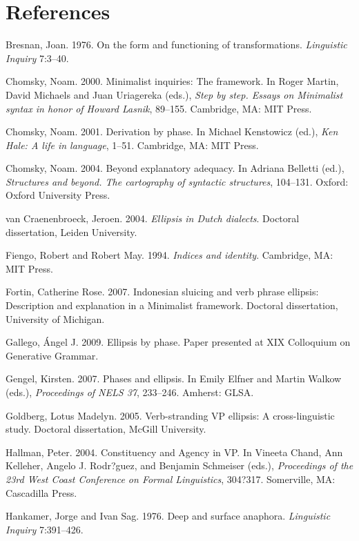 \documentclass[output=paper]{LSP/langsci}
\begin{document}
\section*{References}
 \printbibliography[heading=subbibliography,notkeyword=this]

\begin{reflist}

Bresnan, Joan. 1976. On the form and functioning of transformations. \emph{Linguistic Inquiry} 7:3--40.

Chomsky, Noam. 2000. Minimalist inquiries: The framework. In Roger Martin, David Michaels and Juan Uriagereka (eds.), \emph{Step by step. Essays on Minimalist syntax in honor of Howard Lasnik}, 89--155. Cambridge, MA: MIT Press.

Chomsky, Noam. 2001. Derivation by phase. In Michael Kenstowicz (ed.), \emph{Ken Hale: A life in language}, 1--51. Cambridge, MA: MIT Press.

Chomsky, Noam. 2004. Beyond explanatory adequacy. In Adriana Belletti (ed.), \emph{Structures and beyond. The cartography of syntactic structures}, 104--131. Oxford: Oxford University Press.

van Craenenbroeck, Jeroen. 2004. \emph{Ellipsis in Dutch dialects}. Doctoral dissertation, Leiden University.

Fiengo, Robert and Robert May. 1994. \emph{Indices and identity}. Cambridge, MA: MIT Press.

Fortin, Catherine Rose. 2007. Indonesian sluicing and verb phrase ellipsis: Description and explanation in a Minimalist framework. Doctoral dissertation, University of Michigan. 

Gallego, \'{A}ngel J. 2009. Ellipsis by phase. Paper presented at XIX Colloquium on Generative Grammar. 

Gengel, Kirsten. 2007. Phases and ellipsis. In Emily Elfner and Martin Walkow (eds.), \emph{Proceedings of NELS 37}, 233--246. Amherst: GLSA. 

Goldberg, Lotus Madelyn. 2005. Verb-stranding VP ellipsis: A cross-linguistic study. Doctoral dissertation, McGill University. 

Hallman, Peter. 2004. Constituency and Agency in VP. In Vineeta Chand, Ann Kelleher, Angelo J. Rodr?guez, and Benjamin Schmeiser (eds.), \emph{Proceedings of the 23rd West Coast Conference on Formal Linguistics}, 304?317. Somerville, MA: Cascadilla Press.

Hankamer, Jorge and Ivan Sag. 1976. Deep and surface anaphora. \emph{Linguistic Inquiry} 7:391--426.


\end{reflist}
\end{document}
